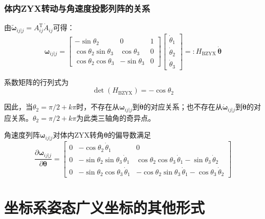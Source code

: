 \subsubsection*{体内ZYX转动与角速度投影列阵的关系}

由$\tilde{\boldsymbol{\omega}}_{ij|j} = A_{ij}^{\mathrm{T}}\dot{A}_{ij}$可得：
\begin{equation}
\boldsymbol{\omega}_{ij|j} =
\begin{bmatrix}
-\sin\theta_2            & 0           & 1 \\[3pt]
\cos\theta_2\sin\theta_3 & \cos\theta_3 & 0 \\[3pt]
\cos\theta_2\cos\theta_3 & -\sin\theta_3& 0
\end{bmatrix}
\begin{bmatrix}
\dot{\theta}_1 \\ \dot{\theta}_2 \\ \dot{\theta}_3
\end{bmatrix}
=: H_{\mathrm{BZYX}}\,\dot{\boldsymbol{\theta}}
\label{eq:7.16}
\end{equation}

系数矩阵的行列式为
\begin{equation}
\det(H_{\mathrm{BZYX}}) = -\cos\theta_2
\end{equation}

因此，当$\theta_2 = \pi/2 + k\pi$时，不存在从$\boldsymbol{\omega}_{ij|j}$到$\dot{\boldsymbol{\theta}}$的对应关系；也不存在从$\dot{\boldsymbol{\omega}}_{ij|j}$到$\ddot{\boldsymbol{\theta}}$的对应关系。$\theta_2 = \pi/2 + k\pi$为此类三轴角的奇异点。

角速度列阵$\boldsymbol{\omega}_{ij|j}$对体内ZYX转角$\boldsymbol{\theta}$的偏导数满足
\begin{equation}
\frac{\partial\boldsymbol{\omega}_{ij|j}}{\partial\boldsymbol{\theta}}
=
\begin{bmatrix}
0 & -\cos\theta_2\,\dot{\theta}_1  & 0 \\[3pt]
0 & -\sin\theta_2\sin\theta_3\,\dot{\theta}_1 & \cos\theta_2\cos\theta_3\,\dot{\theta}_1 - \sin\theta_3\,\dot{\theta}_2 \\[3pt]
0 & -\sin\theta_2\cos\theta_3\,\dot{\theta}_1 & -\cos\theta_2\sin\theta_3\,\dot{\theta}_1 - \cos\theta_3\,\dot{\theta}_2
\end{bmatrix}
\label{eq:7.17}
\end{equation}

\section{坐标系姿态广义坐标的其他形式}

